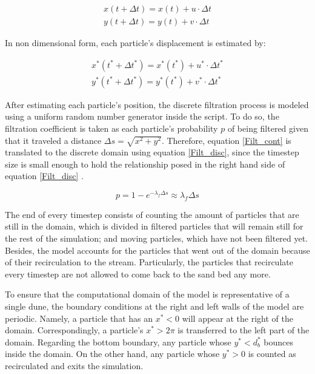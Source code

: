 \documentclass[draft,linenumbers]{agujournal2018}
\begin{document}
\begin{eqnarray}
 \label{dispx}
 	x(t + \Delta t) = x(t)  + u \cdot \Delta t\\
 \label{dispy}
 	y(t + \Delta t) = y(t) + v \cdot \Delta t
 \end{eqnarray}
 
In non dimensional form, each particle's displacement is estimated by:

\begin{eqnarray}
 \label{dispx_s}
 	x^*(t^* + \Delta t^*) = x^*(t^*)  + u^* \cdot \Delta t^*\\
 \label{dispy_s}
 	y^*(t^* + \Delta t^*) = y^*(t^*) + v^* \cdot \Delta t^*
 \end{eqnarray}
 
After estimating each particle's position, the discrete filtration process is modeled using a uniform random number generator inside the script. To do so, the filtration coefficient is taken as each  particle's probability $p$ of being filtered given that it traveled a distance $\Delta s = \sqrt{x^2 + y^2}$. Therefore, equation \ref{Filt_cont} is translated to the discrete domain using equation \ref{Filt_disc}, since the timestep size is small enough to hold the relationship posed in the right hand side of equation \ref{Filt_disc} \citep{Li2017}.
 
 \begin{equation}
 \label{Filt_disc}
 	p = 1 - e^{-\lambda_f \Delta s} \approx \lambda_{f} \Delta s
 \end{equation}

The end of every timestep consists of counting the amount of particles that are still in the domain, which is divided in filtered particles that will remain still for the rest of the simulation; and moving particles, which have not been filtered yet. Besides, the model accounts for the particles that went out of the domain because of their recirculation to the stream. Particularly, the particles that recirculate every timestep are not allowed to come back to the sand bed any more. 

To ensure that the computational domain of the model is representative of a single dune, the boundary conditions at the right and left walls of the model are periodic. Namely, a particle that has an $x^* < 0$ will appear at the right of the domain. Correspondingly, a particle's $x^* > 2 \pi$ is transferred to the left part of the domain. Regarding the bottom boundary, any particle whose $y^* < d_b^*$ bounces inside the domain. On the other hand, any particle whose $y^* > 0$ is counted as recirculated and exits the simulation. 
\end{document}
